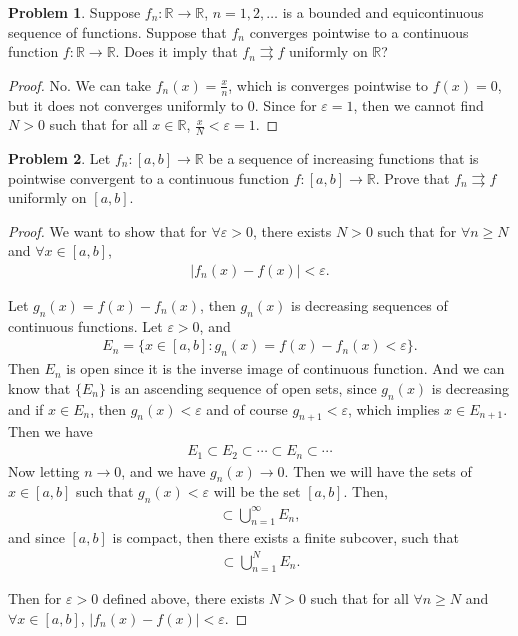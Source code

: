 \documentclass[11pt]{article}
\theoremstyle{definition}
\newtheorem{problem}{Problem}
\theoremstyle{definition}
\begin{document}
\medskip

\begin{problem}
Suppose $f_n:\mathbb{R}\to\mathbb{R}$,
$n=1,2,\ldots$ is a bounded and equicontinuous sequence of functions.
Suppose that $f_n$ converges pointwise to a continuous
function $f:\mathbb{R}\to\mathbb{R}$.
Does it imply that
$f_n\rightrightarrows f$ uniformly on $\mathbb{R}$?
\end{problem}
\begin{proof}
No. We can take $f_n(x) = \frac{x}{n}$, which is converges pointwise to $f(x) = 0$, but it does not converges uniformly to $0$. Since for $\varepsilon = 1$, then we cannot find $N > 0$ such that for all $x\in\mathbb{R}$, $\frac{x}{N} < \varepsilon = 1$. 
\end{proof}

\medskip

\begin{problem}
Let $f_n:[a,b]\to\mathbb{R}$ be a sequence
of increasing functions that is pointwise convergent to a
continuous function $f:[a,b]\to\mathbb{R}$. Prove that
$f_n\rightrightarrows f$ uniformly on $[a,b]$.
\end{problem}
\begin{proof}
We want to show that for $\forall \varepsilon > 0$, there exists $N > 0$ such that for $\forall n \geq N$ and $\forall x\in [a,b]$, 
\begin{align*}
    |f_n(x) - f(x)| < \varepsilon.
\end{align*}

Let $g_n(x) = f(x) - f_n(x)$, then $g_n(x)$ is decreasing sequences of continuous functions. Let $\varepsilon > 0$, and 
\begin{align*}
    E_n = \{x\in [a,b]: g_n(x) = f(x) - f_n(x) < \varepsilon\}.
\end{align*}
Then $E_n$ is open since it is the inverse image of continuous function. And we can know that $\{E_n\}$ is an ascending sequence of open sets, since $g_n(x)$ is decreasing and if $x\in E_n$, then $g_n(x) < \varepsilon$ and of course $g_{n+1} < \varepsilon$, which implies $x\in E_{n+1}$. Then we have
\begin{align*}
    E_1\subset E_2\subset \cdots \subset E_n \subset \cdots 
\end{align*}
Now letting $n\to 0$, and we have $g_n(x)\to 0$. Then we will have the sets of $x\in [a,b]$ such that $g_n(x) < \varepsilon$ will be the set $[a,b]$. Then,
\begin{align*}
    [a,b] \subset \bigcup^\infty_{n=1} E_n,
\end{align*}
and since $[a,b]$ is compact, then there exists a finite subcover, such that 
\begin{align*}
    [a,b] \subset \bigcup^N_{n=1} E_n.
\end{align*}

Then for $\varepsilon > 0$ defined above, there exists $N > 0$ such that for all $\forall n \geq N$ and $\forall x\in [a,b]$, $|f_n(x) - f(x)| < \varepsilon$.
\end{proof}
\end{document}
